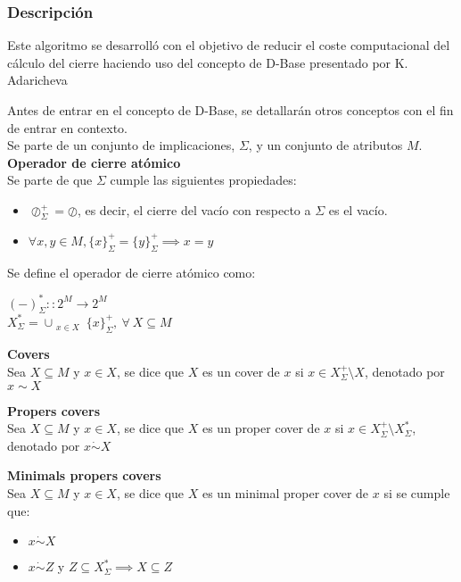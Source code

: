 \subsubsection{Descripci\'on} 


Este algoritmo \cite{DBasis} se desarroll\'o con el objetivo  de reducir el coste computacional del c\'alculo del cierre haciendo uso del concepto de D-Base presentado por K. Adaricheva \cite{Adaricheva}

Antes de entrar en el concepto de D-Base, se detallar\'an otros conceptos con el fin de entrar en contexto.\\

Se parte de un conjunto de implicaciones, \( \Sigma \), y un conjunto de atributos \( M \).\\

\textbf{Operador de cierre at\'omico}\\
Se parte de que \(\Sigma\) cumple las siguientes propiedades:
\begin{itemize}
    \item \(\oslash^+_{\Sigma} = \oslash\), es decir, el cierre del vac\'io con respecto a \(\Sigma\) es el vac\'io.
    \item \(\forall x,y \in M, \{x\}^+_{\Sigma} = \{y\}^+_{\Sigma} \implies x = y\)
\end{itemize}
Se define el operador de cierre at\'omico como: 
\begin{center}
    \((-)^*_{\Sigma}::2^M \to 2^M \) \\
    \(X^*_{\Sigma} = \cup_{\substack{x \in X}} \{x\}^+_{\Sigma}, \ \forall \ X \subseteq M \)
\end{center}


\textbf{Covers}\\
Sea \(X \subseteq M\) y \(x \in X\), se dice que \(X\) es un cover de \(x\) si \(x \in X^+_{\Sigma} \setminus X\), denotado por \(x \sim X\)

\textbf{Propers covers} \\
Sea \(X \subseteq M\) y \(x \in X\), se dice que \(X\) es un proper cover de \(x\) si \(x \in X^+_{\Sigma} \setminus X^*_{\Sigma}\), denotado por \(x \dot\sim X\)

\textbf{Minimals propers covers}\\
Sea \(X \subseteq M\) y \(x \in X\), se dice que \(X\) es un minimal proper cover de \(x\) si se cumple que:
\begin{itemize}
    \item \(x \dot\sim X\)
    \item \(x \dot\sim Z\) y \(Z \subseteq X^*_{\Sigma} \implies X \subseteq Z\)
\end{itemize}

